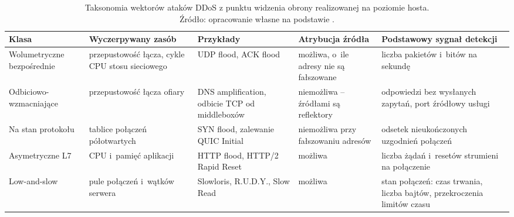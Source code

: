 \documentclass[a4paper,12pt]{article}
\begin{document}
\begin{table}[H]
    \centering
    \caption{Taksonomia wektorów ataków DDoS z punktu widzenia obrony realizowanej na poziomie hosta. \\ Źródło: opracowanie własne na podstawie \cite{rfc4732,nawrocki2021far,bock2021weaponizing,sikora2021generator}.}
    \label{tab:taksonomia}
    \footnotesize
    \begin{tabularx}{\linewidth}{@{}>{\raggedright\arraybackslash}p{2.6cm}>{\raggedright\arraybackslash}X>{\raggedright\arraybackslash}X>{\raggedright\arraybackslash}p{2.6cm}>{\raggedright\arraybackslash}X@{}}
        \toprule
        Klasa & Wyczerpywany zasób & Przykłady & Atrybucja źródła & Podstawowy sygnał detekcji \\
        \midrule
        Wolumetryczne bezpośrednie & przepustowość łącza, cykle CPU stosu sieciowego & UDP flood, ACK flood & możliwa, o~ile adresy nie są fałszowane & liczba pakietów i~bitów na sekundę \\
        Odbiciowo-wzmacniające & przepustowość łącza ofiary & DNS amplification, odbicie TCP od middleboxów & niemożliwa -- źródłami są reflektory & odpowiedzi bez wysłanych zapytań, port źródłowy usługi \\
        Na stan protokołu & tablice połączeń półotwartych & SYN flood, zalewanie QUIC Initial & niemożliwa przy fałszowaniu adresów & odsetek nieukończonych uzgodnień połączeń \\
        Asymetryczne L7 & CPU i~pamięć aplikacji & HTTP flood, HTTP/2 Rapid Reset & możliwa & liczba żądań i~resetów strumieni na połączenie \\
        Low-and-slow & pule połączeń i~wątków serwera & Slowloris, R.U.D.Y., Slow Read & możliwa & stan połączeń: czas trwania, liczba bajtów, przekroczenia limitów czasu \\
        \bottomrule
    \end{tabularx}
\end{table}
\end{document}
